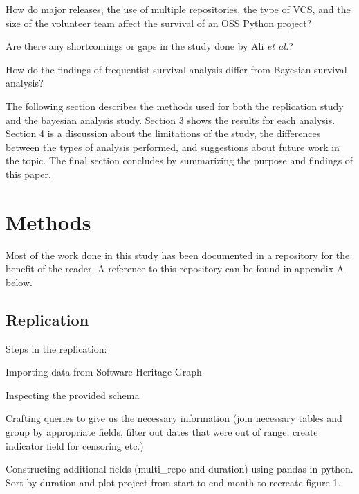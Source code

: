 \documentclass[acmconf]{acmart}
\begin{document}
\begin{questions}
    \item How do major releases, the use of multiple repositories, the type of VCS, and the size of the volunteer team affect the survival of an OSS Python project?
    \item Are there any shortcomings or gaps in the study done by Ali \emph{et al.}?
    \item How do the findings of frequentist survival analysis differ from Bayesian survival analysis?
\end{questions}

The following section describes the methods used for both the replication study and the bayesian analysis study.
Section 3 shows the results for each analysis.
Section 4 is a discussion about the limitations of the study, the differences between the types of analysis performed, and suggestions about future work in the topic.
The final section concludes by summarizing the purpose and findings of this paper. 

\section{Methods}

Most of the work done in this study has been documented in a repository for the benefit of the reader.
A reference to this repository  can be found in appendix A below. 

\subsection{Replication}


Steps in the replication:

Importing data from Software Heritage Graph \cite{pietri2019software}

Inspecting the provided schema

Crafting queries to give us the necessary information (join necessary tables and group by appropriate fields, filter out dates that were out of range, create indicator field for censoring etc.)

Constructing additional fields (multi\_repo and duration) using pandas in python. Sort by duration and plot project from start to end month to recreate figure 1.
\end{document}
